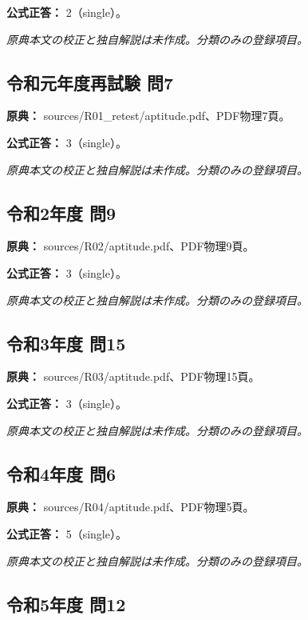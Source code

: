 \textbf{公式正答：} 2（single）。

\par\textit{原典本文の校正と独自解説は未作成。分類のみの登録項目。}

\subsection{令和元年度再試験 問7}
\label{q:r01-ret-apt-07}

\noindent\textbf{原典：} sources/R01\_retest/aptitude.pdf、PDF物理7頁。

\textbf{公式正答：} 3（single）。

\par\textit{原典本文の校正と独自解説は未作成。分類のみの登録項目。}

\subsection{令和2年度 問9}
\label{q:r02-reg-apt-09}

\noindent\textbf{原典：} sources/R02/aptitude.pdf、PDF物理9頁。

\textbf{公式正答：} 3（single）。

\par\textit{原典本文の校正と独自解説は未作成。分類のみの登録項目。}

\subsection{令和3年度 問15}
\label{q:r03-reg-apt-15}

\noindent\textbf{原典：} sources/R03/aptitude.pdf、PDF物理15頁。

\textbf{公式正答：} 3（single）。

\par\textit{原典本文の校正と独自解説は未作成。分類のみの登録項目。}

\subsection{令和4年度 問6}
\label{q:r04-reg-apt-06}

\noindent\textbf{原典：} sources/R04/aptitude.pdf、PDF物理5頁。

\textbf{公式正答：} 5（single）。

\par\textit{原典本文の校正と独自解説は未作成。分類のみの登録項目。}

\subsection{令和5年度 問12}
\label{q:r05-reg-apt-12}

